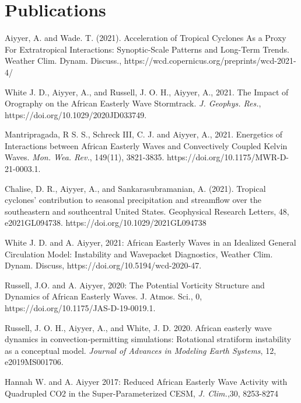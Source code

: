 \section*{Publications}

\begin{ilist}


\item Aiyyer, A. and Wade. T. (2021). Acceleration of Tropical Cyclones As a Proxy For Extratropical
Interactions: Synoptic-Scale Patterns and Long-Term Trends. Weather Clim. Dynam. Discuss., https://wcd.copernicus.org/preprints/wcd-2021-4/

\item White J. D., Aiyyer, A., and Russell, J. O. H., Aiyyer, A., 2021. The Impact of Orography on the African Easterly Wave Stormtrack.  \emph{J. Geophys. Res.}, https://doi.org/10.1029/2020JD033749.
  

\item Mantripragada, R S. S., Schreck III, C. J. and Aiyyer, A., 2021. Energetics of Interactions between African Easterly Waves and Convectively Coupled Kelvin Waves.  \emph{Mon. Wea. Rev.}, 149(11), 3821-3835.  https://doi.org/10.1175/MWR-D-21-0003.1.

\item Chalise, D. R., Aiyyer, A., and Sankarasubramanian, A. (2021). Tropical cyclones’ contribution to seasonal precipitation and streamflow over the southeastern and southcentral United States. Geophysical Research Letters, 48, e2021GL094738. https://doi.org/10.1029/2021GL094738
  
\item White J. D. and A. Aiyyer, 2021: African Easterly Waves in an Idealized General Circulation Model: Instability and Wavepacket Diagnostics, Weather Clim. Dynam. Discuss, https://doi.org/10.5194/wcd-2020-47.
 
\item Russell, J.O. and A. Aiyyer, 2020: The Potential Vorticity Structure and Dynamics of African Easterly Waves. J. Atmos. Sci., 0, https://doi.org/10.1175/JAS-D-19-0019.1.

\item Russell, J. O. H., Aiyyer, A., and White, J. D. 2020. African easterly wave dynamics in convection‐permitting simulations: Rotational stratiform instability as a conceptual model. \emph{Journal of Advances in Modeling Earth Systems}, 12, e2019MS001706.
  
\item Hannah W. and A. Aiyyer 2017: Reduced African Easterly Wave Activity with Quadrupled
  CO2 in the Super-Parameterized CESM, \emph{J. Clim.},30, 8253-8274


\end{ilist}
